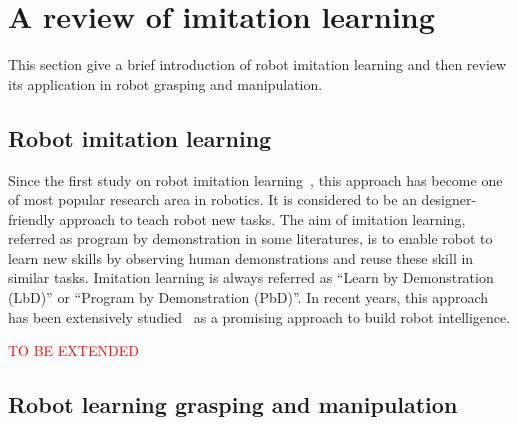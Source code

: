 \section{A review of imitation learning}
\label{cha2:sec2:learning}

This section give a brief introduction of robot imitation learning and then review its application in robot grasping and manipulation.

\subsection{Robot imitation learning}
Since the first study on robot imitation learning~\citep{friedrich1996robot}, this approach has become one of most popular research area in robotics. It is considered to be an designer-friendly approach to teach robot new tasks. The aim of imitation learning, referred as program by demonstration in some literatures, is to enable robot to learn new skills by observing human demonstrations and reuse these skill in similar tasks. Imitation learning is always referred as ``Learn by Demonstration (LbD)'' or ``Program by Demonstration (PbD)''. In recent years, this approach has been extensively studied~\citep{calinon2007learning,calinon2008robot,dillmann2004teaching,kulic2012incremental} as a promising approach to build robot intelligence.

\textcolor{red}{TO BE EXTENDED}

\subsection{Robot learning grasping and manipulation }
\label{cha2:sec4:grasping-learning}


